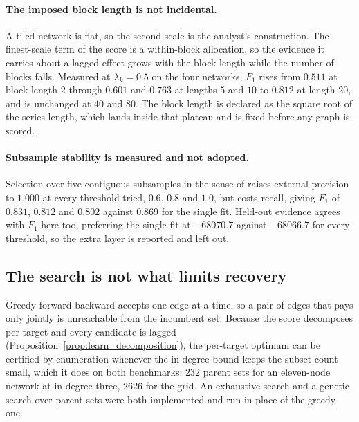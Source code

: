 \paragraph{The imposed block length is not incidental.}
A tiled network is flat, so the second scale is the analyst's construction. The
finest-scale term of the score is a within-block allocation, so the evidence it
carries about a lagged effect grows with the block length while the number of
blocks falls. Measured at $\lambda_k = 0.5$ on the four networks, $F_1$ rises
from $0.511$ at block length $2$ through $0.601$ and $0.763$ at lengths $5$ and
$10$ to $0.812$ at length $20$, and is unchanged at $40$ and $80$. The block length is declared as the square root of the series length,
which lands inside that plateau and is fixed before any graph is scored.

\paragraph{Subsample stability is measured and not adopted.}
Selection over five contiguous subsamples in the sense of
\citet{meinshausen2010stability} raises external precision to $1.000$ at every
threshold tried, $0.6$, $0.8$ and $1.0$, but costs recall, giving $F_1$ of
$0.831$, $0.812$ and $0.802$ against $0.869$ for the single fit. Held-out
evidence agrees with $F_1$ here too, preferring the single fit at $-68070.7$
against $-68066.7$ for every threshold, so the extra layer is reported and left
out.

\subsection{The search is not what limits recovery}
\label{sec:results:search}

Greedy forward-backward accepts one edge at a time, so a pair of edges that
pays only jointly is unreachable from the incumbent set. Because the score
decomposes per target and every candidate is lagged
(Proposition~\ref{prop:learn_decomposition}), the per-target optimum can be certified
by enumeration whenever the in-degree bound keeps the subset count small, which
it does on both benchmarks: $232$ parent sets for an eleven-node network at
in-degree three, $2626$ for the grid. An exhaustive search and a genetic search
over parent sets were both implemented and run in place of the greedy one.

